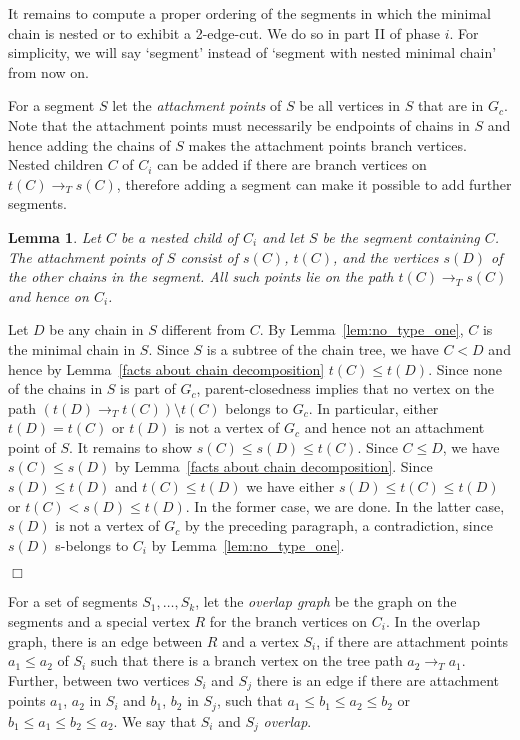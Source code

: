 \documentclass[paper=a4]{scrartcl}
\newtheorem{lemma}{Lemma}
\newcommand{\qed}{}
\newcommand{\mqed}{\hfill$\Box$}
\newlength{\proofpostskipamount}\newlength{\proofpreskipamount}
\newenvironment{proof}{\par\vspace{\proofpreskipamount}\noindent{\textbf{Proof:}}\hspace{0.5em}}{\nopagebreak \strut\nopagebreak \hspace{\fill}\mqed\par\vspace{\proofpostskipamount}\noindent}
\begin{document}
It remains to compute a proper ordering of the segments in which the minimal chain is nested or to exhibit a 2-edge-cut. We do so in part II of phase $i$. For simplicity, we will say `segment' instead of `segment with nested minimal chain' from now on.

For a segment $S$ let the \emph{attachment points} of $S$ be all vertices in $S$ that are in $G_c$. Note that the attachment points must necessarily be endpoints of chains in $S$ and hence adding the chains of $S$ makes the attachment points branch vertices. Nested children $C$ of $C_i$ can be added if there are branch vertices on $t(C)\rightarrow_T s(C)$, therefore adding a segment can make it possible to add further segments.

\begin{lemma}\label{prop:attachment points} Let $C$ be a nested child of $C_i$ and let $S$ be the segment containing $C$. The attachment points of $S$ consist of $s(C)$, $t(C)$, and the vertices $s(D)$ of the other chains in the segment. All such points lie on the path $t(C) \rightarrow_T s(C)$ and hence on $C_i$. \end{lemma} 
\begin{proof} Let $D$ be any chain in $S$ different from $C$. By Lemma~\ref{lem:no_type_one}, $C$ is the minimal chain in $S$. Since $S$ is a subtree of the chain tree, we have $C < D$ and hence by Lemma~\ref{facts about chain decomposition} $t(C) \le t(D)$. Since none of the chains in $S$ is part of $G_c$, parent-closedness implies that no vertex on the path $(t(D) \rightarrow_T t(C))\setminus t(C)$ belongs to $G_c$. In particular, either $t(D) = t(C)$ or $t(D)$ is not a vertex of $G_c$ and hence not an attachment point of $S$. It remains to show $s(C) \le s(D) \le t(C)$. Since $C \le D$, we have $s(C)\le s(D)$ by Lemma~\ref{facts about chain decomposition}. Since $s(D) \le t(D)$ and $t(C) \le t(D)$ we have either $s(D) \le t(C) \le t(D)$ or $t(C) < s(D) \le t(D)$. In the former case, we are done. In the latter case, $s(D)$ is not a vertex of $G_c$ by the preceding paragraph, a contradiction, since $s(D)$ s-belongs to $C_i$ by Lemma~\ref{lem:no_type_one}.
\qed
\end{proof}

For a set of segments $S_1,\ldots, S_k$, let the \emph{overlap graph} be the graph on the segments and a special vertex $R$ for the branch vertices on $C_i$. In the overlap graph, there is an edge between $R$ and a vertex $S_i$, if there are attachment points $a_1\le a_2$ of $S_i$ such that there is a branch vertex on the tree path $a_2\rightarrow_T a_1$. Further, between two vertices $S_i$ and $S_j$ there is an edge if there are attachment points $a_1$, $a_2$ in $S_i$ and $b_1$, $b_2$ in $S_j$, such that $a_1\le b_1\le a_2 \le b_2$ or $b_1 \le a_1 \le b_2 \le a_2$. We say that $S_i$ and $S_j$ \emph{overlap}.
\end{document}
